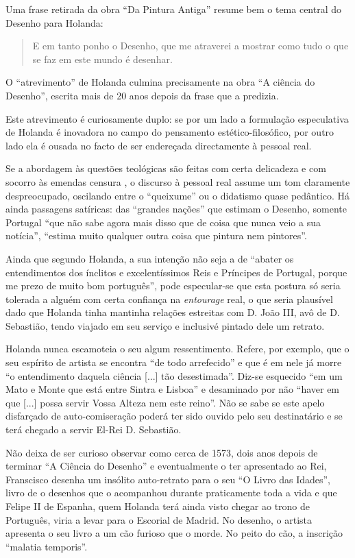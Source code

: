 \documentclass{article}
\begin{document}
Uma frase retirada da obra ``Da Pintura Antiga'' resume bem o tema
central do Desenho para Holanda:

\begin{quote}
  E em tanto ponho o Desenho, que me atraverei a mostrar como tudo o
  que se faz em este mundo é desenhar.
\end{quote}

O ``atrevimento'' de Holanda culmina precisamente na obra ``A ciência
do Desenho'', escrita mais de 20 anos depois da frase que a predizia.

Este atrevimento é curiosamente duplo: se por um lado a formulação
especulativa de Holanda é inovadora no campo do pensamento
estético-filosófico, por outro lado ela é ousada no facto de ser
endereçada directamente à pessoal real.

Se a abordagem às questões teológicas são feitas com certa delicadeza
e com socorro às emendas censura , o discurso à pessoal real assume um
tom claramente despreocupado, oscilando entre o ``queixume'' ou o
didatismo quase pedântico. Há ainda passagens satíricas: das ``grandes
nações'' que estimam o Desenho, somente Portugal ``que não sabe agora
mais disso que de coisa que nunca veio a sua notícia'', ``estima muito
qualquer outra coisa que pintura nem pintores''.

Ainda que segundo Holanda, a sua intenção não seja a de ``abater os
entendimentos dos ínclitos e excelentíssimos Reis e Príncipes de
Portugal, porque me prezo de muito bom português'', pode especular-se
que esta postura só seria tolerada a alguém com certa confiança na
\emph{entourage} real, o que seria plausível dado que Holanda tinha
mantinha relações estreitas com D. João III, avô de D. Sebastião,
tendo viajado em seu serviço e inclusivé pintado dele um retrato.

Holanda nunca escamoteia o seu algum ressentimento. Refere, por
exemplo, que o seu espírito de artista se encontra ``de todo
arrefecido'' e que é em nele já morre ``o entendimento daquela ciência
[...] tão desestimada''. Diz-se esquecido ``em um Mato e Monte que
está entre Sintra e Lisboa'' e desaminado por não ``haver em que [...]
possa servir Vossa Alteza nem este reino''. Não se sabe se este apelo
disfarçado de auto-comiseração poderá ter sido ouvido pelo seu
destinatário e se terá chegado a servir El-Rei D. Sebastião.

Não deixa de ser curioso observar como cerca de 1573, dois anos depois
de terminar ``A Ciência do Desenho'' e eventualmente o ter apresentado
ao Rei, Franscisco desenha um insólito auto-retrato para o seu ``O
Livro das Idades'', livro de o desenhos que o acompanhou durante
praticamente toda a vida e que Felipe II de Espanha, quem Holanda terá
ainda visto chegar ao trono de Português, viria a levar para o
Escorial de Madrid. No desenho, o artista apresenta o seu livro a um
cão furioso que o morde. No peito do cão, a inscrição ``malatia
temporis''.

\printbibliography[heading=bibliography,title={Bibliografia}]
\end{document}
